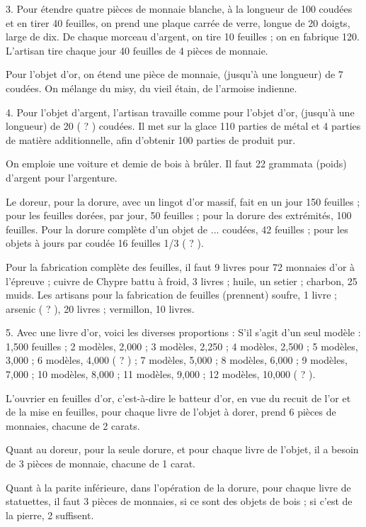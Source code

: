 \documentclass[a4paper, 11pt, oneside, polutonikogreek, french]{article}
\begin{document}
3. Pour étendre quatre pièces de monnaie blanche, à la longueur de 100 coudées et en tirer 40 feuilles, on prend une plaque carrée de verre, longue de 20 doigts, large de dix. De chaque morceau d'argent, on tire 10 feuilles ; on en fabrique 120. L'artisan tire chaque jour 40 feuilles de 4 pièces de monnaie.

Pour l'objet d'or, on étend une pièce de monnaie, (jusqu'à une longueur) de 7 coudées. On mélange du misy, du vieil étain, de l'armoise indienne.

4. Pour l'objet d'argent, l'artisan travaille comme pour l'objet d'or, (jusqu'à une longueur) de 20 ( ? ) coudées. Il met sur la glace 110 parties de métal et 4 parties de matière additionnelle, afin d'obtenir 100 parties de produit pur.

On emploie une voiture et demie de bois à brûler. Il faut 22 grammata (poids) d'argent pour l'argenture.

Le doreur, pour la dorure, avec un lingot d'or massif, fait en un jour 150 feuilles ; pour les feuilles dorées, par jour, 50 feuilles ; pour la dorure des extrémités, 100 feuilles. Pour la dorure complète d'un objet de ... coudées, 42 feuilles ; pour les objets à jours par coudée 16 feuilles 1/3 ( ? ).

Pour la fabrication complète des feuilles, il faut 9 livres pour 72 monnaies d'or à l'épreuve ; cuivre de Chypre battu à froid, 3 livres ; huile, un setier ; charbon, 25 muids. Les artisans pour la fabrication de feuilles (prennent) soufre, 1 livre ; arsenic ( ? ), 20 livres ; vermillon, 10 livres.

5. Avec une livre d'or, voici les diverses proportions : S'il s'agit d'un seul modèle : 1,500 feuilles ; 2 modèles, 2,000 ; 3 modèles, 2,250 ; 4 modèles, 2,500 ; 5 modèles, 3,000 ; 6 modèles, 4,000 ( ? ) ; 7 modèles, 5,000 ; 8 modèles, 6,000 ; 9 modèles, 7,000 ; 10 modèles, 8,000 ; 11 modèles, 9,000 ; 12 modèles, 10,000 ( ? ).

L'ouvrier en feuilles d'or, c'est-à-dire le batteur d'or, en vue du recuit de l'or et de la mise en feuilles, pour chaque livre de l'objet à dorer, prend 6 pièces de monnaies, chacune de 2 carats.

Quant au doreur, pour la seule dorure, et pour chaque livre de l'objet, il a besoin de 3 pièces de monnaie, chacune de 1 carat.

Quant à la parite inférieure, dans l'opération de la dorure, pour chaque livre de statuettes, il faut 3 pièces de monnaies, si ce sont des objets de bois ; si c'est de la pierre, 2 suffisent.
\end{document}
